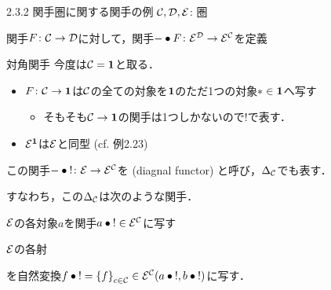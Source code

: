\documentclass[uplatex,a4paper,dvipdfmx,aspectratio=169,10pt]{beamer}
\begin{document}
\begin{frame}[fragile]{2.3.2 関手圏に関する関手の例}
    $\mathcal{C}, \mathcal{D}, \mathcal{E}$: 圏

     関手$F \colon \mathcal{C} \to \mathcal{D}$に対して，関手$- \bullet F \colon \mathcal{E}^{\mathcal{D}} \to \mathcal{E}^{\mathcal{C}}$を定義
    \begin{exampleblock}{ 対角関手}
        今度は$\mathcal{C} = {\mathord{\mathbf{1}}}$と取る．
        \begin{itemize}
            \item $F \colon \mathcal{C} \to {\mathord{\mathbf{1}}}$は$\mathcal{C}$の全ての対象を${\mathord{\mathbf{1}}}$のただ1つの対象$* \in {\mathord{\mathbf{1}}}$へ写す
                \begin{itemize}
                    \item そもそも$\mathcal{C} \to {\mathord{\mathbf{1}}}$の関手は1つしかないので$!$で表す．
                \end{itemize}
            \item $\mathcal{E}^{\mathord{\mathbf{1}}}$は$\mathcal{E}$と同型 (cf. 例2.23)
        \end{itemize}
        この関手$- \bullet {!} \colon \mathcal{E} \to \mathcal{E}^{\mathcal{C}}$を (diagnal functor) と呼び，$\Delta_{\mathcal{C}}$でも表す．
    \end{exampleblock}
    すなわち，この$\Delta_{\mathcal{C}}$は次のような関手．
        \begin{description}[対象への作用:]
            \item[対象への作用:] $\mathcal{E}$の各対象$a$を関手$a \bullet {!} \in \mathcal{E}^{\mathcal{C}}$に写す
            \item[射への作用:] $\mathcal{E}$の各射を自然変換$f \bullet {!} = \qty{f}_{c \in \mathcal{C}} \in \mathcal{E}^{\mathcal{C}}(a \bullet {!}, b \bullet {!})$に写す．
        \end{description}
\end{frame}
\end{document}
